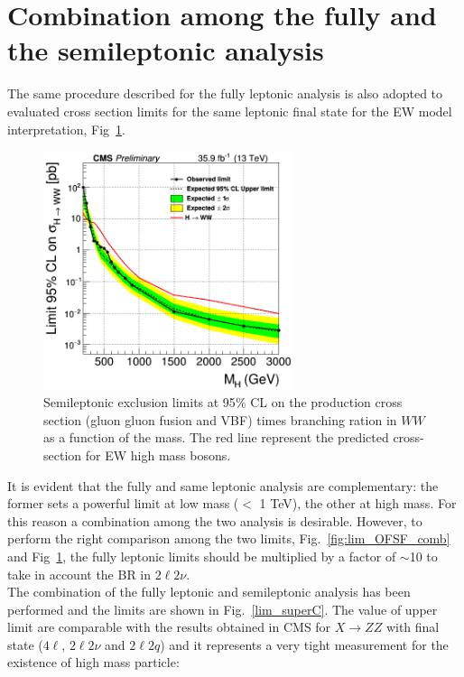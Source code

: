 \section{Combination among the fully and the semileptonic analysis}
The same procedure described for the fully leptonic analysis is also adopted to evaluated cross section limits  for the same leptonic final state
for the EW model interpretation, Fig~\ref{limit_observed_lnuqq_VBF0_log-1}.
\begin{figure}[htb]
\centering
\includegraphics[width=0.65\textwidth]{../Cap6/lnuqq}
\caption{Semileptonic exclusion limits at 95$\%$ CL  on the production cross section (gluon gluon fusion and VBF) times branching ration in $WW$ as a function of the mass.  The red line represent the predicted cross-section for EW high mass bosons.}
\label{limit_observed_lnuqq_VBF0_log-1}
\end{figure}
It is evident that the fully and same leptonic analysis are complementary: 
the former sets a powerful limit at low mass ($<$ 1 TeV), the other at  high mass. For this reason a combination among the two analysis is desirable.
However, to perform the right comparison among the two limits,  Fig.~\ref{fig:lim_OFSF_comb} and  Fig~\ref{limit_observed_lnuqq_VBF0_log-1}, the 
fully leptonic limits should be multiplied by a factor of $\sim$10 to take in account the BR in $ 2\ell 2\nu$.\\
\newline
The  combination of the fully leptonic and semileptonic analysis has been performed and the limits are shown in Fig.~\ref{lim_superC}. 
The value of upper limit are comparable with the results obtained in CMS for $X \to ZZ$ with final state ($4\ell$, $2\ell 2\nu$ and $2\ell 2q$) \cite{Sirunyan:2018qlb} and it represents a very tight measurement  for the existence of  high mass particle: 
